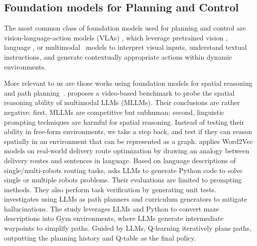 \subsection{Foundation models for Planning and Control}
The most common class of foundation models used for planning and control are vision-language-action models (VLAs) \cite{kim2024openvla, zhen20243d, brohan2023rt}, which leverage pretrained vision \cite{kim2024openvla,oquab2023dinov2}, language \cite{touvron2023llama,chowdhery2023palm}, or multimodal~\cite{zhai2023sigmoid,driess2023palm} models to interpret visual inputs, understand textual instructions, and generate contextually appropriate actions within dynamic environments. 

More relevant to us are those works using foundation models for spatial reasoning and path planning~\citep{yang2024diffusion, yang2024thinking, liu2023can}. \citeauthor{yang2024thinking} proposes a video-based benchmark to probe the spatial reasoning ability of multimodal LLMs (MLLMs). Their conclusions are rather negative: first, MLLMs are competitive but subhuman; second, linguistic prompting techniques are harmful for spatial reasoning. Instead of testing their ability in free-form environments, we take a step back, and test if they can reason spatially in an environment that can be represented as a graph. \citeauthor{liu2023can} applies Word2Vec models on real-world delivery route optimization \cite{merchan20242021} by drawing an analogy between delivery routes and sentences in language. Based on language descriptions of single/multi-robots routing tasks, \citeauthor{huang2024words} asks LLMs to generate Python code to solve single or multiple robots problems. Their evaluations are limited to prompting methods. They also perform task verification by generating unit tests. \citeauthor{deng2024can} investigates using LLMs as path planners and curriculum generators to mitigate hallucinations. The study leverages LLMs and Python to convert maze descriptions into Gym environments, where LLMs generate intermediate waypoints to simplify paths. Guided by LLMs, Q-learning iteratively plans paths, outputting the planning history and Q-table as the final policy.

